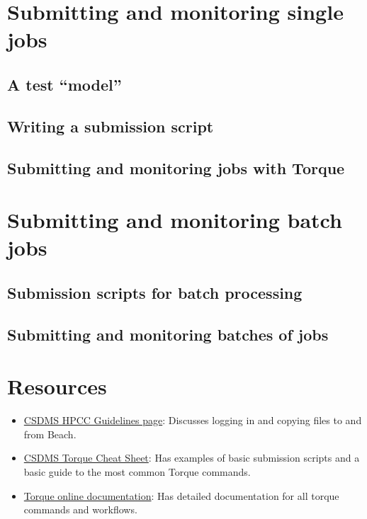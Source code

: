 \documentclass[12pt, oneside]{article}   	%
\begin{document}
\section{Submitting and monitoring single jobs}
\subsection{A test ``model''}
\subsection{Writing a submission script}
\subsection{Submitting and monitoring jobs with Torque}

\section{Submitting and monitoring batch jobs}
\subsection{Submission scripts for batch processing}
\subsection{Submitting and monitoring batches of jobs}

\section{Resources}
\begin{itemize}
\item \href{https://csdms.colorado.edu/wiki/HPCC_guidelines}{CSDMS HPCC Guidelines page}: Discusses logging in and copying files to and from Beach.
\item \href{https://csdms.colorado.edu/wiki/HPCC_usage_rules}{CSDMS Torque Cheat Sheet}: Has examples of basic submission scripts and a basic guide to the most common Torque commands.
\item \href{http://docs.adaptivecomputing.com/torque/4-0-2/help.htm}{Torque online documentation}: Has detailed documentation for all torque commands and workflows.
\end{itemize}
\end{document}
